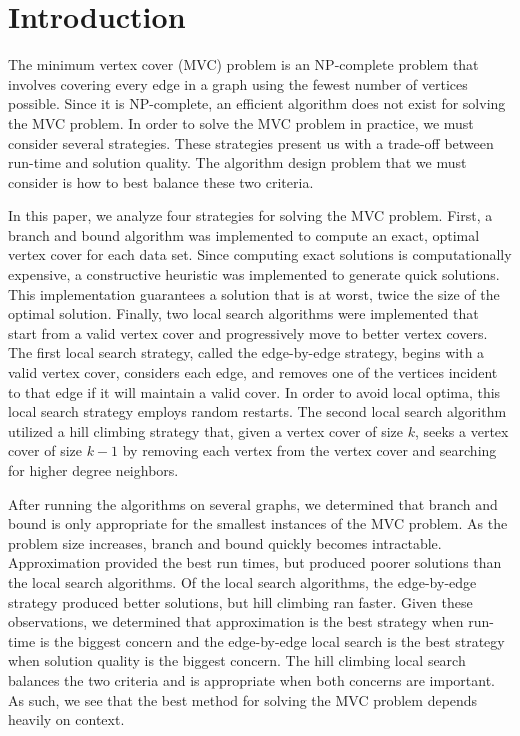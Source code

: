 \documentclass{sig-alternate-05-2015}
\begin{document}
\section{Introduction}
The minimum vertex cover (MVC) problem is an NP-complete problem that involves covering every edge in a graph using the fewest number of vertices possible. Since it is NP-complete, an efficient algorithm does not exist for solving the MVC problem. In order to solve the MVC problem in practice, we must consider several strategies. These strategies present us with a trade-off between run-time and solution quality. The algorithm design problem that we must consider is how to best balance these two criteria.
\par
In this paper, we analyze four strategies for solving the MVC problem. First, a branch and bound algorithm was implemented to compute an exact, optimal vertex cover for each data set. Since computing exact solutions is computationally expensive, a constructive heuristic was implemented to generate quick solutions. This implementation guarantees a solution that is at worst, twice the size of the optimal solution. Finally, two local search algorithms were implemented that start from a valid vertex cover and progressively move to better vertex covers. The first local search strategy, called the edge-by-edge strategy, begins with a valid vertex cover, considers each edge, and removes one of the vertices incident to that edge if it will maintain a valid cover. In order to avoid local optima, this local search strategy employs random restarts. The second local search algorithm utilized a hill climbing strategy that, given a vertex cover of size $k$, seeks a vertex cover of size $k-1$ by removing each vertex from the vertex cover and searching for higher degree neighbors.
\par
After running the algorithms on several graphs, we determined that branch and bound is only appropriate for the smallest instances of the MVC problem. As the problem size increases, branch and bound quickly becomes intractable. Approximation provided the best run times, but produced poorer solutions than the local search algorithms. Of the local search algorithms, the edge-by-edge strategy produced better solutions, but hill climbing ran faster. Given these observations, we determined that approximation is the best strategy when run-time is the biggest concern and the edge-by-edge local search is the best strategy when solution quality is the biggest concern. The hill climbing local search balances the two criteria and is appropriate when both concerns are important. As such, we see that the best method for solving the MVC problem depends heavily on context.
\end{document}
